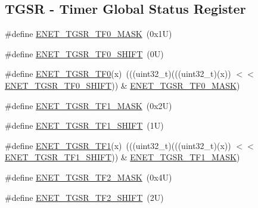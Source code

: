 \subsection*{T\+G\+SR -\/ Timer Global Status Register}
\begin{DoxyCompactItemize}
\item 
\#define \mbox{\hyperlink{group___e_n_e_t___register___masks_gac4b5286f5096d79e0c3a286ad49cf102}{E\+N\+E\+T\+\_\+\+T\+G\+S\+R\+\_\+\+T\+F0\+\_\+\+M\+A\+SK}}~(0x1\+U)
\item 
\#define \mbox{\hyperlink{group___e_n_e_t___register___masks_ga636e49d8773de954ad946d32aa23eeb5}{E\+N\+E\+T\+\_\+\+T\+G\+S\+R\+\_\+\+T\+F0\+\_\+\+S\+H\+I\+FT}}~(0\+U)
\item 
\#define \mbox{\hyperlink{group___e_n_e_t___register___masks_gadf3a27e32894b440da95d25d29f72710}{E\+N\+E\+T\+\_\+\+T\+G\+S\+R\+\_\+\+T\+F0}}(x)~(((uint32\+\_\+t)(((uint32\+\_\+t)(x)) $<$$<$ \mbox{\hyperlink{group___e_n_e_t___register___masks_ga636e49d8773de954ad946d32aa23eeb5}{E\+N\+E\+T\+\_\+\+T\+G\+S\+R\+\_\+\+T\+F0\+\_\+\+S\+H\+I\+FT}})) \& \mbox{\hyperlink{group___e_n_e_t___register___masks_gac4b5286f5096d79e0c3a286ad49cf102}{E\+N\+E\+T\+\_\+\+T\+G\+S\+R\+\_\+\+T\+F0\+\_\+\+M\+A\+SK}})
\item 
\#define \mbox{\hyperlink{group___e_n_e_t___register___masks_ga7cc2fdb7c10440f4ea4974b225588da0}{E\+N\+E\+T\+\_\+\+T\+G\+S\+R\+\_\+\+T\+F1\+\_\+\+M\+A\+SK}}~(0x2\+U)
\item 
\#define \mbox{\hyperlink{group___e_n_e_t___register___masks_ga05bf6e9ffee285ca3fb130b9c8948fa5}{E\+N\+E\+T\+\_\+\+T\+G\+S\+R\+\_\+\+T\+F1\+\_\+\+S\+H\+I\+FT}}~(1\+U)
\item 
\#define \mbox{\hyperlink{group___e_n_e_t___register___masks_ga7643d2192a4b9626b2f5f6d448c14e01}{E\+N\+E\+T\+\_\+\+T\+G\+S\+R\+\_\+\+T\+F1}}(x)~(((uint32\+\_\+t)(((uint32\+\_\+t)(x)) $<$$<$ \mbox{\hyperlink{group___e_n_e_t___register___masks_ga05bf6e9ffee285ca3fb130b9c8948fa5}{E\+N\+E\+T\+\_\+\+T\+G\+S\+R\+\_\+\+T\+F1\+\_\+\+S\+H\+I\+FT}})) \& \mbox{\hyperlink{group___e_n_e_t___register___masks_ga7cc2fdb7c10440f4ea4974b225588da0}{E\+N\+E\+T\+\_\+\+T\+G\+S\+R\+\_\+\+T\+F1\+\_\+\+M\+A\+SK}})
\item 
\#define \mbox{\hyperlink{group___e_n_e_t___register___masks_ga3bb5da9c3f3c88fc7784149aaf536e0c}{E\+N\+E\+T\+\_\+\+T\+G\+S\+R\+\_\+\+T\+F2\+\_\+\+M\+A\+SK}}~(0x4\+U)
\item 
\#define \mbox{\hyperlink{group___e_n_e_t___register___masks_ga8b692cdc1ae33167e75fc033385ea3f2}{E\+N\+E\+T\+\_\+\+T\+G\+S\+R\+\_\+\+T\+F2\+\_\+\+S\+H\+I\+FT}}~(2\+U)

\end{DoxyCompactItemize}
